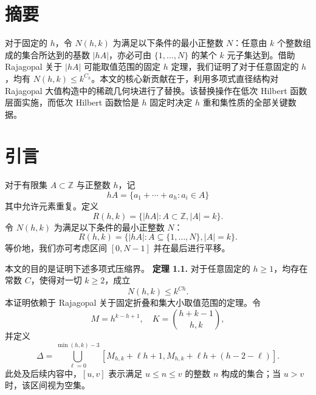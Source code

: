 \documentclass[11pt]{article}
\theoremstyle{break}
\begin{document}
\section*{\textbf{摘要}}

对于固定的 $h$，令 $N(h,k)$ 为满足以下条件的最小正整数 $N$：任意由 $k$ 个整数组成的集合所达到的基数 $|hA|$，亦必可由 $\{1,\dots,N\}$ 的某个 $k$ 元子集达到。借助 Rajagopal 关于 $|hA|$ 可能取值范围的固定 $h$ 定理，我们证明了对于任意固定的 $h$，均有 $N(h,k)\leq k^{C_h}$。本文的核心新贡献在于，利用多项式直径结构对 Rajagopal 大值构造中的稀疏几何块进行了替换。该替换操作在低次 Hilbert 函数层面实施，而低次 Hilbert 函数恰是 $h$ 固定时决定 $h$ 重和集性质的全部关键数据。
\section{引言}

对于有限集 $A \subset \mathbb{Z}$ 与正整数 $h$，记
\[
hA = \{a_1 + \cdots + a_h : a_i \in A\}
\]
其中允许元素重复。定义
\[
R(h,k) = \{|hA| : A \subset \mathbb{Z}, |A| = k\}.
\]
令 $N(h,k)$ 为满足以下条件的最小正整数 $N$：
\[
R(h,k) = \{|hA| : A \subseteq \{1,\dots,N\}, |A| = k\}.
\]
等价地，我们亦可考虑区间 $[0, N-1]$ 并在最后进行平移。

本文的目的是证明下述多项式压缩界。
\textbf{定理 1.1.} 对于任意固定的 $h \ge 1$，均存在常数 $C$，使得对一切 $k \ge 2$，成立
\[
N(h,k) \le k^{Ch}.
\]
本证明依赖于 Rajagopal 关于固定折叠和集大小取值范围的定理。令
\[
M = h^{k-h+1}, \quad K = \binom{h+k-1}{h,k},
\]
并定义
\[
\Delta = \bigcup_{\ell=0}^{\min(h,k)-3} [M_{h,k} + \ell h+1, M_{h,k} + \ell h + (h-2-\ell)].
\]
此处及后续内容中，$[u,v]$ 表示满足 $u \le n \le v$ 的整数 $n$ 构成的集合；当 $u > v$ 时，该区间视为空集。
\end{document}
